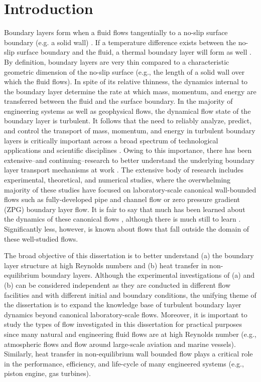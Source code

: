 \chapter{Introduction}

Boundary layers form when a fluid flows tangentially to a no-slip surface boundary (e.g. a solid wall) \cite{Prandtl1905}.  If a temperature difference exists between the no-slip surface boundary and the fluid, a thermal boundary layer will form as well \cite{Kays1980}.  By definition, boundary layers are very thin compared to a characteristic geometric dimension of the no-slip surface (e.g., the length of a solid wall over which the fluid flows). In spite of its relative thinness, the dynamics internal to the boundary layer determine the rate at which mass, momentum, and energy are transferred between the fluid and the surface boundary. In the majority of engineering systems as well as geophysical flows, the dynamical flow state of the boundary layer is turbulent.  It follows that the need to reliably analyze, predict, and control the transport of mass, momentum, and energy in turbulent boundary layers is critically important across a broad spectrum of technological applications and scientific disciplines \cite{Fox2012}. Owing to this importance, there has been extensive--and continuing--research to better understand the underlying boundary layer transport mechanisms at work \cite{Clauser1956}. The extensive body of research includes experimental, theoretical, and numerical studies, where the overwhelming majority of these studies have focused on laboratory-scale canonical wall-bounded flows such as fully-developed pipe and channel flow or zero pressure gradient (ZPG) boundary layer flow. It is fair to say that much has been learned about the dynamics of these canonical flows \cite{Sreenivasan1997}, although there is much still to learn \cite{Sreenivasan1999, Jimenez2012}. Significantly less, however, is known about flows that fall outside the domain of these well-studied flows. 

The broad objective of this dissertation is to better understand (a) the boundary layer structure at high Reynolds numbers and (b) heat transfer in non-equilibrium boundary layers.  Although the experimental investigations of (a) and (b) can be considered independent as they are conducted in different flow facilities and with different initial and boundary conditions, the unifying theme of the dissertation is to expand the knowledge base of turbulent boundary layer dynamics beyond canonical laboratory-scale flows. Moreover, it is important to study the types of flow investigated in this dissertation for practical purposes since many natural and engineering fluid flows are at high Reynolds number (e.g., atmospheric flows and flow around large-scale aviation and marine vessels). Similarly, heat transfer in non-equilibrium wall bounded flow plays a critical role in the performance, efficiency, and life-cycle of many engineered systems (e.g., piston engine, gas turbines).
